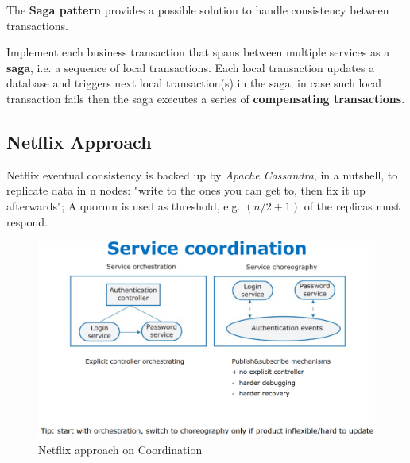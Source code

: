 The \textbf{Saga pattern} provides a possible solution to handle consistency between transactions.

Implement each business transaction that spans between multiple services as a \textbf{saga}, i.e.
a sequence of local transactions.
Each local transaction updates a database and triggers next local transaction(s) in the saga;
in case such local transaction fails then the saga executes a series of \textbf{compensating transactions}.


\subsection{Netflix Approach}

Netflix eventual consistency is backed up by \textit{Apache Cassandra},
in a nutshell, to replicate data in n nodes:
"write to the ones you can get to, then fix it up afterwards";
A quorum is used as threshold, e.g. $(n/2 + 1)$ of the replicas must respond.

\begin{figure}[htbp]
   \centering
   \includegraphics{images/netflix_coordination.png}
   \caption{Netflix approach on Coordination}
   \label{fig:netflix_coordination}
\end{figure}

